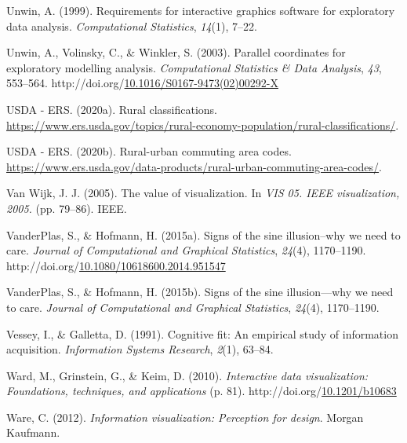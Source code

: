 \documentclass[print]{nuthesis}
\newlength{\cslhangindent}
\newenvironment{CSLReferences}[2]%
{\setlength{\parindent}{0pt}%
\everypar{\setlength{\hangindent}{\cslhangindent}}\ignorespaces}%
{\par}
\begin{document}
\begin{CSLReferences}{1}{0}
\leavevmode{}%
Unwin, A. (1999). Requirements for interactive graphics software for exploratory data analysis. \emph{Computational Statistics}, \emph{14}(1), 7--22.

\leavevmode{}%
Unwin, A., Volinsky, C., \& Winkler, S. (2003). Parallel coordinates for exploratory modelling analysis. \emph{Computational Statistics \& Data Analysis}, \emph{43}, 553--564. http://doi.org/\href{https://doi.org/10.1016/S0167-9473(02)00292-X}{10.1016/S0167-9473(02)00292-X}

\leavevmode{}%
USDA - ERS. (2020a). Rural classifications. \url{https://www.ers.usda.gov/topics/rural-economy-population/rural-classifications/}.

\leavevmode{}%
USDA - ERS. (2020b). Rural-urban commuting area codes. \url{https://www.ers.usda.gov/data-products/rural-urban-commuting-area-codes/}.

\leavevmode{}%
Van Wijk, J. J. (2005). The value of visualization. In \emph{VIS 05. IEEE visualization, 2005.} (pp. 79--86). IEEE.

\leavevmode{}%
VanderPlas, S., \& Hofmann, H. (2015a). Signs of the sine illusion--why we need to care. \emph{Journal of Computational and Graphical Statistics}, \emph{24}(4), 1170--1190. http://doi.org/\href{https://doi.org/10.1080/10618600.2014.951547}{10.1080/10618600.2014.951547}

\leavevmode{}%
VanderPlas, S., \& Hofmann, H. (2015b). Signs of the sine illusion---why we need to care. \emph{Journal of Computational and Graphical Statistics}, \emph{24}(4), 1170--1190.

\leavevmode{}%
Vessey, I., \& Galletta, D. (1991). Cognitive fit: An empirical study of information acquisition. \emph{Information Systems Research}, \emph{2}(1), 63--84.

\leavevmode{}%
Ward, M., Grinstein, G., \& Keim, D. (2010). \emph{Interactive data visualization: Foundations, techniques, and applications} (p. 81). http://doi.org/\href{https://doi.org/10.1201/b10683}{10.1201/b10683}

\leavevmode{}%
Ware, C. (2012). \emph{Information visualization: Perception for design}. Morgan Kaufmann.


\end{CSLReferences}
\end{document}
